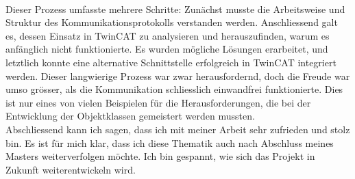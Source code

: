 \\
Dieser Prozess umfasste mehrere Schritte: Zunächst musste die Arbeitsweise und Struktur des Kommunikationsprotokolls verstanden werden. Anschliessend galt es, dessen Einsatz in TwinCAT zu analysieren und herauszufinden, warum es anfänglich nicht funktionierte. Es wurden mögliche Lösungen erarbeitet, und letztlich konnte eine alternative Schnittstelle erfolgreich in TwinCAT integriert werden. Dieser langwierige Prozess war zwar herausfordernd, doch die Freude war umso grösser, als die Kommunikation schliesslich einwandfrei funktionierte. Dies ist nur eines von vielen Beispielen für die Herausforderungen, die bei der Entwicklung der Objektklassen gemeistert werden mussten.
\\
Abschliessend kann ich sagen, dass ich mit meiner Arbeit sehr zufrieden und stolz bin. Es ist für mich klar, dass ich diese Thematik auch nach Abschluss meines Masters weiterverfolgen möchte. Ich bin gespannt, wie sich das Projekt in Zukunft weiterentwickeln wird.
